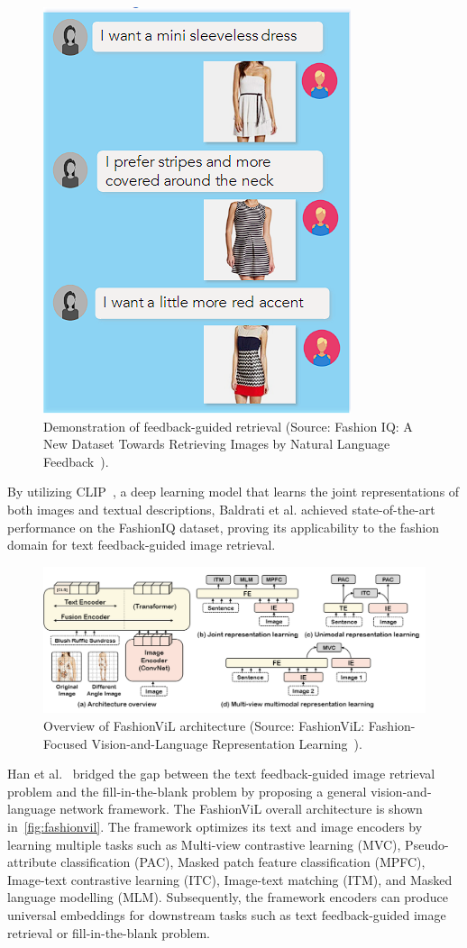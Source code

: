 \begin{figure}[h!]
    \centering
    \includegraphics[width=0.4\linewidth]{content/resources/images/literature-review/fashioniq.PNG}
    \caption{Demonstration of feedback-guided retrieval (Source: Fashion IQ: A New Dataset Towards Retrieving Images by Natural Language Feedback~\cite{Wu-CVPR2021-FashionIQ}).}
    \label{fig:fashioniq}
\end{figure}

By utilizing CLIP~\cite{Radford-OpenAIblog2019-Language}, a deep learning model that learns the joint representations of both images and textual descriptions, Baldrati et al. \cite{Baldrati-CVPR2022-Effective, Baldrati-CVPR2022-Conditioned} achieved state-of-the-art performance on the FashionIQ dataset, proving its applicability to the fashion domain for text feedback-guided image retrieval. 

\begin{figure}[h!]
    \centering
    \includegraphics[width=\linewidth]{content/resources/images/literature-review/fashionvil.PNG}
    \caption{Overview of FashionViL architecture (Source: FashionViL: Fashion-Focused
Vision-and-Language Representation Learning~\cite{Han-ECCV2022-FashionViL}).}
    \label{fig:fashionvil}
\end{figure}

Han et al.~\cite{Han-ECCV2022-FashionViL} bridged the gap between the text feedback-guided image retrieval problem and the fill-in-the-blank problem by proposing a general vision-and-language network framework. The FashionViL overall architecture is shown in~\autoref{fig:fashionvil}. The framework optimizes its text and image encoders by learning multiple tasks such as Multi-view contrastive learning (MVC), Pseudo-attribute classification (PAC), Masked patch feature classification (MPFC), Image-text contrastive learning (ITC), Image-text matching (ITM), and Masked language modelling (MLM). Subsequently, the framework encoders can produce universal embeddings for downstream tasks such as text feedback-guided image retrieval or fill-in-the-blank problem.
